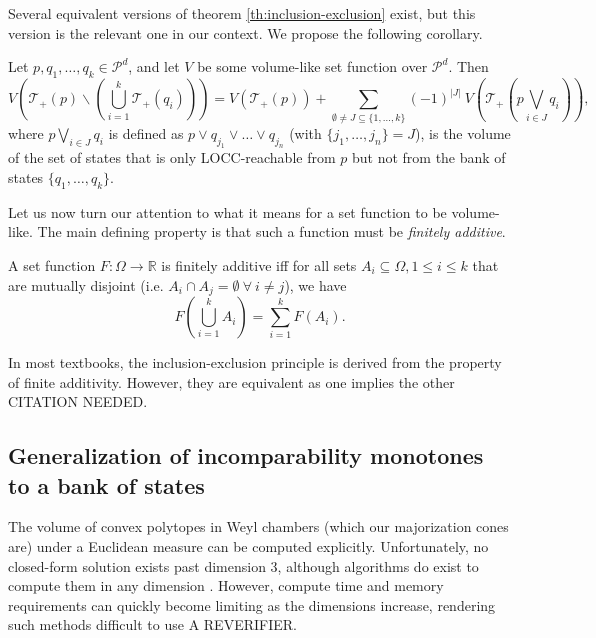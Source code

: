 Several equivalent versions of theorem \ref{th:inclusion-exclusion} exist, but this version is the relevant one in our context. We propose the following corollary.

\begin{corollary} \label{corr:LOCC_inclusion-exclusion}
    Let $p, q_1, \dots, q_k \in \mathcal{P}^d$, and let $V$ be some volume-like set function over $\mathcal{P}^d$. Then
    \begin{equation} \label{eq:LOCC_inclusion-exclusion}
        V\left(\mathcal{T}_+(p) \backslash \left(\bigcup\limits_{i = 1}^k \mathcal{T}_+(q_i)\right)\right) = V\left(\mathcal{T}_+(p)\right) + \sum_{\emptyset \neq J \subseteq \{1, \dots, k\}} (-1)^{|J|} \: V\left(\mathcal{T}_+\left(p \bigvee\limits_{i \in J} q_i\right)\right),
    \end{equation}
    where $p \bigvee\limits_{i \in J} q_i$ is defined as $p \vee q_{j_1} \vee \dots \vee q_{j_n}$ (with $\{j_1, \dots, j_n\} = J$), is the volume of the set of states that is only LOCC-reachable from $p$ but not from the bank of states $\{q_1, \dots, q_k\}$.
\end{corollary}

Let us now turn our attention to what it means for a set function to be volume-like. The main defining property is that such a function must be \textit{finitely additive}.

\begin{definition}
    A set function $F: \Omega \rightarrow \mathbb{R}$ is finitely additive iff for all sets $A_i \subseteq \Omega, 1 \leq i \leq k$ that are mutually disjoint (i.e. $A_i \cap A_j = \emptyset \: \forall \: i \neq j$), we have
    \begin{equation}
        F\left(\bigcup\limits_{i = 1}^k A_i\right) = \sum_{i=1}^k F(A_i).
    \end{equation}
\end{definition}

In most textbooks, the inclusion-exclusion principle is derived from the property of finite additivity. However, they are equivalent as one implies the other CITATION NEEDED.



\subsection{Generalization of incomparability monotones to a bank of states}

The volume of convex polytopes in Weyl chambers (which our majorization cones are) under a Euclidean measure can be computed explicitly. Unfortunately, no closed-form solution exists past dimension 3, although algorithms do exist to compute them in any dimension \cite{junior_geometric_2022}. However, compute time and memory requirements can quickly become limiting as the dimensions increase, rendering such methods difficult to use \cite{bueler_exact_2000} A REVERIFIER.

